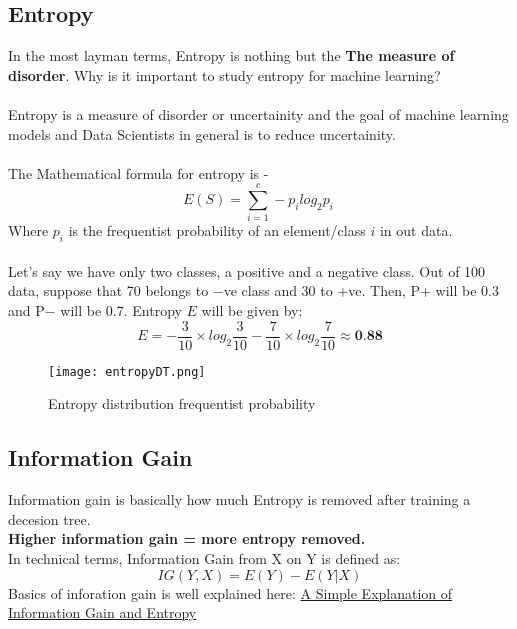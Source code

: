 \documentclass[12pt, A4]{report}
\begin{document}
\subsection*{Entropy}
	In the most layman terms, Entropy is nothing but the \textbf{The measure of disorder}.
	Why is it important to study entropy for machine learning? \\
	\\ Entropy is a measure of disorder or uncertainity and the goal of machine learning models and Data Scientists in general is to reduce uncertainity.\\
	\\ The Mathematical formula for entropy is - 
	\begin{equation}\label {eq:entropy}
		E(S) = \sum_{i=1}^c - p_i log_2 p_i\
	\end{equation}
	Where $p_i$ is the frequentist probability of an element/class $i$ in out data.\\
	\\ Let's say we have only two classes, a positive and a negative class. Out of 100 data, suppose that 70 belongs to $-$ve class and 30 to $+$ve. Then, P$+$ will be 0.3 and P$-$ will be 0.7.
	\vspace{4mm}
	Entropy $E$ will be given by:
	\begin{equation}
		E = -\frac{3}{10} \times log_2{\frac{3}{10}}-\frac{7}{10} \times log_2{\frac{7}{10}} \approx \textbf{0.88}
	\end{equation}
	\begin{figure}[h]
		\centering
		\texttt{[image: entropyDT.png]}
		\caption{Entropy distribution frequentist probability}
	\end{figure}

\subsection*{Information Gain}
	Information gain is basically how much Entropy is removed after training a decesion tree.\\
	\textbf{Higher information gain = more entropy removed.}\\
	In technical terms, Information Gain from X on Y is defined as:
	\begin{equation}\label{eq:inforamtion gain}
		IG(Y,X) = E(Y) - E(Y|X)
	\end{equation}
	Basics of inforation gain is well explained here: \href{https://victorzhou.com/blog/information-gain/}{A Simple Explanation of Information Gain and Entropy}
\end{document}
